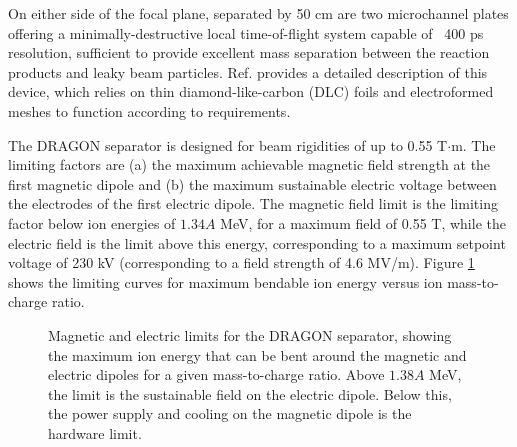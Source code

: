 On either side of the focal plane, separated by 50 cm are two microchannel plates offering a minimally-destructive local time-of-flight system capable of ~400 ps resolution, sufficient to provide excellent mass separation between the reaction products and leaky beam particles. Ref. \cite{vock09} provides a detailed description of this device, which relies on thin diamond-like-carbon (DLC) foils and electroformed meshes to function according to requirements. 

The DRAGON separator is designed for beam rigidities of up to 0.55 T$\cdot$m. The limiting factors are (a) the maximum achievable magnetic field strength at the first magnetic dipole and (b) the maximum sustainable electric voltage between the electrodes of the first electric dipole. The magnetic field limit is the limiting factor below ion energies of $1.34A$ MeV, for a maximum field of 0.55 T, while the electric field is the limit above this energy, corresponding to a maximum setpoint voltage of 230 kV (corresponding to a field strength of 4.6 MV/m). Figure \ref{fig:rigidity} shows the limiting curves for maximum bendable ion energy versus ion mass-to-charge ratio.   

\begin{figure}
\caption{Magnetic and electric limits for the DRAGON separator, showing the maximum ion energy that can be bent around the magnetic and electric dipoles for a given mass-to-charge ratio. Above $1.38A$ MeV, the limit is the sustainable field on the electric dipole. Below this, the power supply and cooling on the magnetic dipole is the hardware limit.}
\label{fig:rigidity}
\end{figure}

